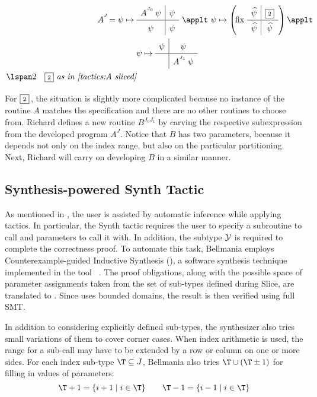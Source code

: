 \begin{example}
\begin{equation}
  \renewcommand\arraystretch{1.5}
  \begin{array}{@{} r @{} l @{}}
    A^{^J}\! = \psi\mapsto{} & \quadrants{A^{^{J_0}}\,\psi}{\psi}{\psi}{\psi} ~ \applt 
       ~\psi \mapsto \left(\!\fix\, \quadrants{\lifted\psi}{\qbox2}{\lifted\psi}{\lifted\psi}\right) \applt \\[5mm]
       & \psi \mapsto \quadrants{\psi}{\psi}{}{A^{^{J_1}}\,\psi} \\
    \lspan2{
     \quad
     \qbox2 \textit{ as in \Cref{tactics:A sliced}}
    }
  \end{array}
  \hspace{-5mm}
  \label{tactics:A synthed}
\end{equation}

For $\fbox{\rm\scriptsize2}$\,, the situation is slightly more complicated because no instance of the routine
$A$ matches the specification and there are no other routines to choose from.
Richard defines a new routine $B^{J_0J_1}$ by carving the respective
subexpression from the developed program $A^J$.
Notice that $B$ has two parameters, because it depends not only on the index
range, but also on the particular partitioning.
Next, Richard will carry on developing $B$ in a similar manner.

\end{example}

\subsection{Synthesis-powered {\sf Synth} Tactic}
\label{tactics:synthesis}

As mentioned in , the user is assisted by automatic
inference while applying tactics. In particular, the {\sf Synth} tactic requires
the user to specify a subroutine to call and parameters to call it with.
In addition, the subtype $\mathcal{Y}$ is required to complete the correctness proof.
To automate this task, Bellmania employs Counterexample-guided Inductive Synthesis ({\cegis}), a software synthesis technique
implemented in the tool {\Sketch}~\cite{STTT13/Solar-Lezama}. The proof obligations, along with the possible
space of parameter assignments taken from the set of sub-types defined during
{\sf Slice}, are translated to {\Sketch}. Since {\Sketch} uses bounded domains,
the result is then verified using full SMT.

In addition to considering explicitly defined sub-types, the synthesizer also tries
small variations of them to cover corner cases. When index arithmetic is used,
the range for a sub-call may have to be extended by a row or column on one or more sides.
For each index sub-type $\T\subseteq J$, Bellmania also tries $\T\cup(\T\pm 1)$ for filling in values of parameters:
\[\T+1=\{i+1\;|\;i\in \T\} \qquad \T-1=\{i-1\;|\;i\in \T\}\]

